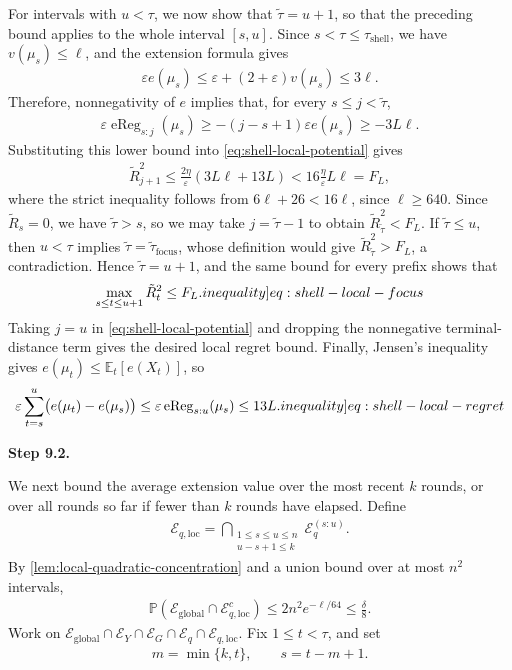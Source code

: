 \documentclass[12pt,cleveref]{jmlr}
\newcommand{\ineqlabel}[1]{\label[inequality]{#1}}
\newcommand{\proofstepinline}[1]{%
    \par\addvspace{0.6\baselineskip}
    \noindent
    {\normalfont\normalsize\bfseries\color{blue!55!black}Step #1.}\enspace\ignorespaces
}
\newcommand{\E}{\mathbb E}
\newcommand{\Pp}{\mathbb P}
\newcommand{\1}{\mathbf 1}
\newcommand{\eps}{\varepsilon}
\begin{document}
For intervals with $u<\tau$, we now show that $\tilde\tau=u+1$, so that
the preceding bound applies to the whole interval $[s,u]$.
Since $s<\tau\leq \tau_{\mathrm{shell}}$, we have $v(\mu_s)\leq\ell$, and the extension formula gives
\begin{align}
    \eps e(\mu_s)
    \leq\eps+(2+\eps)v(\mu_s)\leq3\ell.
\end{align}
Therefore, nonnegativity of $e$ implies that, for every $s\leq j<\tilde\tau$,
\begin{align}
    \eps\operatorname{eReg}_{s:j}(\mu_s)
    \geq-(j-s+1)\eps e(\mu_s)
    \geq-3L\ell.
\end{align}
Substituting this lower bound into \cref{eq:shell-local-potential} gives
\begin{align}
    \tilde R_{j+1}^2
    \leq\frac{2\eta}{\eps}
    \left(3L\ell+13L\right)
    <16\frac{\eta}{\eps}L\ell=F_L,
\end{align}
where the strict inequality follows from $6\ell+26<16\ell$, since $\ell\geq640$.
Since $\tilde R_s=0$, we have $\tilde\tau>s$, so we may take
$j=\tilde\tau-1$ to obtain $\tilde R_{\tilde\tau}^2<F_L$.
If $\tilde\tau\leq u$, then $u<\tau$ implies
$\tilde\tau=\tilde\tau_{\mathrm{focus}}$, whose definition would give
$\tilde R_{\tilde\tau}^2>F_L$, a contradiction.
Hence $\tilde\tau=u+1$, and the same bound for every prefix shows that
\begin{align}
    \max_{s\leq t\leq u+1}\tilde R_t^2\leq F_L.
    \ineqlabel{eq:shell-local-focus}
\end{align}
Taking $j=u$ in \cref{eq:shell-local-potential} and dropping the
nonnegative terminal-distance term gives the desired local regret bound.
Finally, Jensen's inequality gives $e(\mu_t)\leq\E_t[e(X_t)]$, so
\begin{align}
    \eps\sum_{t=s}^{u}\bigl(e(\mu_t)-e(\mu_s)\bigr)
    \leq\eps\operatorname{eReg}_{s:u}(\mu_s)
    \leq13L.
    \ineqlabel{eq:shell-local-regret}
\end{align}

\proofstepinline{9.2}
We next bound the average extension value over the most recent $k$
rounds, or over all rounds so far if fewer than $k$ rounds have elapsed.
Define
\begin{align}
    \mathcal E_{q,\mathrm{loc}}
    =\bigcap_{\substack{1\leq s\leq u\leq n \\u-s+1\leq k}}
    \mathcal E_q^{(s:u)}.
\end{align}
By \cref{lem:local-quadratic-concentration} and a union bound over
at most $n^2$ intervals,
\begin{align}
    \Pp\left(\mathcal E_{\mathrm{global}}\cap
    \mathcal E_{q,\mathrm{loc}}^c\right)
    \leq2n^2e^{-\ell/64}\leq\frac{\delta}{8}.
\end{align}
Work on
$\mathcal E_{\mathrm{global}}\cap\mathcal E_Y\cap\mathcal E_G
\cap\mathcal E_q\cap\mathcal E_{q,\mathrm{loc}}$.
Fix $1\leq t<\tau$, and set
\begin{align}
    m=\min\{k,t\},\qquad s=t-m+1.
\end{align}
\end{document}
